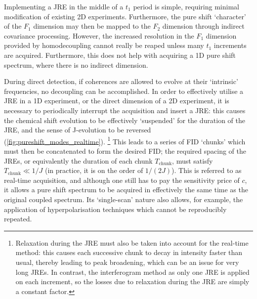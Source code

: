 Implementing a JRE in the middle of a $t_1$ period is simple, requiring minimal modification of existing 2D experiments.
Furthermore, the pure shift `character' of the $F_1$ dimension may then be mapped to the $F_2$ dimension through indirect covariance processing\autocite{Bruschweiler2004JCP,Zhang2004JACS,Jaeger2014ARNMRS,Morris2010JACS,Aguilar2012ACIE,Foroozandeh2014JACS}.
However, the increased resolution in the $F_1$ dimension provided by homodecoupling cannot really be reaped unless many $t_1$ increments are acquired.
Furthermore, this does not help with acquiring a 1D pure shift spectrum, where there is no indirect dimension.

During direct detection, if coherences are allowed to evolve at their `intrinsic' frequencies, no decoupling can be accomplished.
In order to effectively utilise a JRE in a 1D experiment, or the direct dimension of a 2D experiment, it is necessary to periodically interrupt the acquisition and insert a JRE: this causes the chemical shift evolution to be effectively `suspended' for the duration of the JRE, and the sense of J-evolution to be reversed (\cref{fig:pureshift_modes_realtime}).%
\footnote{Relaxation during the JRE must also be taken into account for the real-time method: this causes each successive chunk to decay in intensity faster than usual, thereby leading to peak broadening, which can be an issue for very long JREs.
In contrast, the interferogram method as only one JRE is applied on each increment, so the losses due to relaxation during the JRE are simply a constant factor.}
This leads to a series of FID `chunks' which must then be concatenated to form the desired FID; the required spacing of the JREs, or equivalently the duration of each chunk $T_\text{chunk}$, must satisfy $T_\text{chunk} \ll 1/J$ (in practice, it is on the order of $1/(2J)$).
This is referred to as real-time acquisition\autocite{Lupulescu2012JMR,Meyer2013ACIE,Kiraly2018MRC}, and although one still has to pay the sensitivity price of $c$, it allows a pure shift spectrum to be acquired in effectively the same time as the original coupled spectrum.
Its `single-scan' nature also allows, for example, the application of hyperpolarisation techniques which cannot be reproducibly repeated.\autocite{Donovan2014ACIE,Taylor2021MRC}


